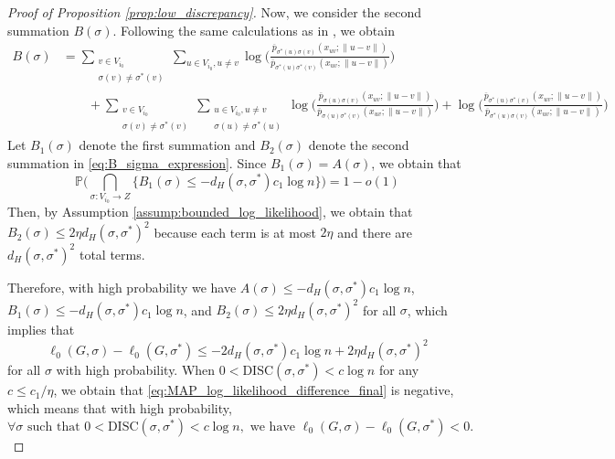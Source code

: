 \documentclass{article}
\renewcommand{\P}{\mathbb{P}}
\newcommand{\1}{\mathbbm{1}}
\theoremstyle{definition}
\theoremstyle{plain}
\begin{document}
\begin{proof}[Proof of Proposition \ref{prop:low_discrepancy}]
    Now, we consider the second summation $B(\sigma)$. Following the same calculations as in \cite{Gaudio+2025}, we obtain
    \begin{equation}
    \label{eq:B_sigma_expression}
    \begin{aligned}
        B(\sigma) &= \sum_{\substack{v \in V_{i_0} \\ \sigma(v) \neq \sigma^*(v)}} \sum_{u \in V_{i_0}, u \neq v}  \log \bigg(\frac{\overline{p}_{\sigma^*(u)\sigma(v)}(x_{uv}; \|u - v\|)}{\overline{p}_{\sigma^*(u)\sigma^*(v)}(x_{uv}; \|u - v\|)} \bigg) \\
        &\qquad+ \sum_{\substack{v \in V_{i_0} \\ \sigma(v) \neq \sigma^*(v)}} \sum_{\substack{u \in V_{i_0}, u \neq v \\ \sigma(u) \neq \sigma^*(u)}} \log \bigg(\frac{\overline{p}_{\sigma(u)\sigma(v)}(x_{uv}; \|u - v\|)}{\overline{p}_{\sigma(u)\sigma^*(v)}(x_{uv}; \|u - v\|)} \bigg) + \log \bigg(\frac{\overline{p}_{\sigma^*(u)\sigma^*(v)}(x_{uv}; \|u - v\|)}{\overline{p}_{\sigma^*(u)\sigma(v)}(x_{uv}; \|u - v\|)} \bigg) 
    \end{aligned}
    \end{equation}
    Let $B_1(\sigma)$ denote the first summation and $B_2(\sigma)$ denote the second summation in  \eqref{eq:B_sigma_expression}. Since $B_1(\sigma) = A(\sigma)$, we obtain that
    \begin{equation*}
        \P\bigg(\bigcap_{\sigma:V_{i_0} \to Z} \{B_1(\sigma) \leq -d_H(\sigma, \sigma^*) c_1 \log n \} \bigg) = 1 - o(1)
    \end{equation*}
    Then, by Assumption \ref{assump:bounded_log_likelihood}, we obtain that $B_2(\sigma) \leq 2 \eta d_H(\sigma, \sigma^*)^2$ because each term is at most $2 \eta$ and there are $d_H(\sigma, \sigma^*)^2$ total terms. 

    Therefore, with high probability we have $A(\sigma) \leq -d_H(\sigma, \sigma^*)c_1 \log n$, $B_1(\sigma) \leq -d_H(\sigma, \sigma^*)c_1 \log n$, and $B_2(\sigma) \leq 2\eta d_H(\sigma, \sigma^*)^2$ for all $\sigma$, which implies that
    \begin{equation}
    \label{eq:MAP_log_likelihood_difference_final}
        \ell_0(G, \sigma) - \ell_0(G, \sigma^*) \leq -2d_H(\sigma, \sigma^*)c_1 \log n + 2 \eta d_H(\sigma, \sigma^*)^2
    \end{equation}
    for all $\sigma$ with high probability. When $0 < \text{DISC}(\sigma, \sigma^*) < c \log n$ for any $c \leq c_1/\eta$, we obtain that \eqref{eq:MAP_log_likelihood_difference_final} is negative, which means that with high probability,
    \begin{equation*}
        \forall \sigma \text{ such that } 0 < \text{DISC}(\sigma, \sigma^*) < c \log n, \text{ we have } \ell_0(G,\sigma) - \ell_0(G, \sigma^*) < 0.
    \end{equation*}
\end{proof}
\end{document}
